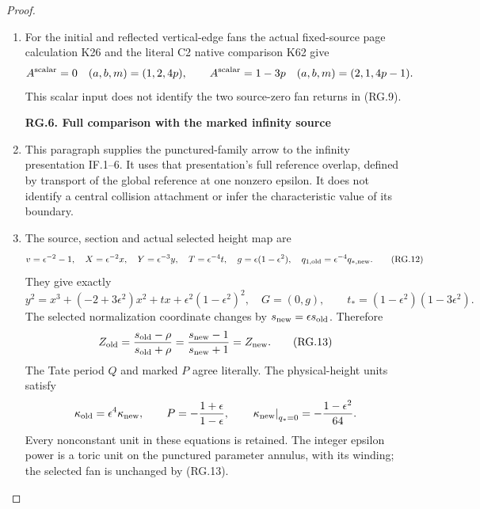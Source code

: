 \begin{proof}
\begin{enumerate}[label=\arabic*.]
\item For the initial and reflected vertical-edge fans the actual
fixed-source page calculation K26 and the literal C2 native
comparison K62 give
\[
 A^{\rm scalar}=0\quad(a,b,m)=(1,2,4p),\qquad
 A^{\rm scalar}=1-3p\quad(a,b,m)=(2,1,4p-1).
\]
This scalar input does not identify the two source-zero fan
returns in (RG.9).

\par

\medskip\noindent\textbf{RG.6. Full comparison with the marked infinity source}

\par\nobreak

\item This paragraph supplies the punctured-family arrow to the infinity
presentation IF.1--6. It uses that presentation's full reference
overlap, defined by transport of the global reference at one
nonzero epsilon. It does not identify a central collision attachment
or infer the characteristic value of its boundary.

\item The source, section and actual selected height map are
\[
 v=\epsilon^{-2}-1,\quad
 X=\epsilon^{-2}x,\quad Y=\epsilon^{-3}y,\quad
 T=\epsilon^{-4}t,\quad
 g=\epsilon(1-\epsilon^2),\quad
 q_{1,\rm old}=\epsilon^{-4}q_{*,\rm new}.
                                                        \tag{RG.12}
\]
They give exactly
\[
 y^2=x^3+(-2+3\epsilon^2)x^2+tx+
              \epsilon^2(1-\epsilon^2)^2,\quad G=(0,g),
\qquad
 t_*=(1-\epsilon^2)(1-3\epsilon^2).
\]
The selected normalization coordinate changes by
\(s_{\rm new}=\epsilon s_{\rm old}\). Therefore
\[
 Z_{\rm old}=\frac{s_{\rm old}-\rho}{s_{\rm old}+\rho}
            =\frac{s_{\rm new}-1}{s_{\rm new}+1}
            =Z_{\rm new}.
                                                        \tag{RG.13}
\]
The Tate period \(Q\) and marked \(P\) agree literally.
The physical-height units satisfy
\[
 \kappa_{\rm old}=\epsilon^4\kappa_{\rm new},\qquad
 P=-\frac{1+\epsilon}{1-\epsilon},\qquad
 \left.\kappa_{\rm new}\right|_{q_*=0}
                       =-\frac{1-\epsilon^2}{64}.
\]
Every nonconstant unit in these equations is retained. The
integer epsilon power is a toric unit on the punctured parameter
annulus, with its winding; the selected fan is unchanged by
(RG.13).


\end{enumerate}
\end{proof}
